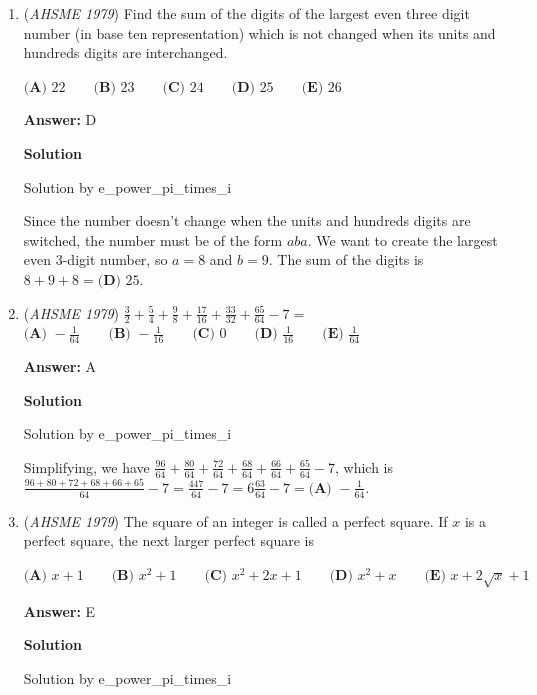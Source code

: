 \begin{enumerate}
 \textbf{Answer: }E


	\item (\textit{AHSME 1979}) Find the sum of the digits of the largest even three digit number (in base ten representation) 
which is not changed when its units and hundreds digits are interchanged.


 $\textbf{(A) }22\qquad \textbf{(B) }23\qquad \textbf{(C) }24\qquad \textbf{(D) }25\qquad \textbf{(E) }26$

 \textbf{Answer: }D



\textbf{Solution}

Solution by e\_power\_pi\_times\_i

 Since the number doesn't change when the units and hundreds digits are switched, the number must be of the form $aba$. We want to create the largest even $3$-digit number, so $a = 8$ and $b = 9$. The sum of the digits is $8+9+8 = \boxed{\textbf{(D) } 25}$.

 


	\item (\textit{AHSME 1979}) $\frac{3}{2}+\frac{5}{4}+\frac{9}{8}+\frac{17}{16}+\frac{33}{32}+\frac{65}{64}-7=$
$\textbf{(A) }-\frac{1}{64}\qquad \textbf{(B) }-\frac{1}{16}\qquad \textbf{(C) }0\qquad \textbf{(D) }\frac{1}{16}\qquad \textbf{(E) }\frac{1}{64}$

 \textbf{Answer: }A



\textbf{Solution}

Solution by e\_power\_pi\_times\_i

 Simplifying, we have $\frac{96}{64}+\frac{80}{64}+\frac{72}{64}+\frac{68}{64}+\frac{66}{64}+\frac{65}{64}-7$, which is $\frac{96+80+72+68+66+65}{64}-7 = \frac{447}{64}-7 = 6\frac{63}{64}-7 = \boxed{\textbf{(A) } -\frac{1}{64}}$.

 


	\item (\textit{AHSME 1979}) The square of an integer is called a perfect square. If $x$ is a perfect square, the next larger perfect square is


 $\textbf{(A) }x+1\qquad \textbf{(B) }x^2+1\qquad \textbf{(C) }x^2+2x+1\qquad \textbf{(D) }x^2+x\qquad \textbf{(E) }x+2\sqrt{x}+1$

 \textbf{Answer: }E



\textbf{Solution}

Solution by e\_power\_pi\_times\_i


\end{enumerate}
